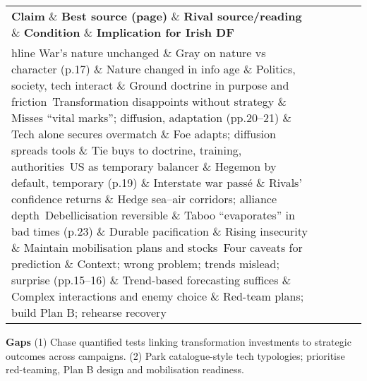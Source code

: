  
\begin{tabular}{p{3.2cm}p{4.2cm}p{3.6cm}p{3.2cm}p{4.2cm}}
	\textbf{Claim} \& \textbf{Best source (page)} \& \textbf{Rival source/reading} \& \textbf{Condition} \& \textbf{Implication for Irish DF}\\hline
	War’s nature unchanged \& Gray on nature vs character (p.17) \& Nature changed in info age \& Politics, society, tech interact \& Ground doctrine in purpose and friction\
	Transformation disappoints without strategy \& Misses “vital marks”; diffusion, adaptation (pp.20–21) \& Tech alone secures overmatch \& Foe adapts; diffusion spreads tools \& Tie buys to doctrine, training, authorities\
	US as temporary balancer \& Hegemon by default, temporary (p.19) \& Interstate war passé \& Rivals’ confidence returns \& Hedge sea–air corridors; alliance depth\
	Debellicisation reversible \& Taboo “evaporates” in bad times (p.23) \& Durable pacification \& Rising insecurity \& Maintain mobilisation plans and stocks\
	Four caveats for prediction \& Context; wrong problem; trends mislead; surprise (pp.15–16) \& Trend-based forecasting suffices \& Complex interactions and enemy choice \& Red-team plans; build Plan B; rehearse recovery\
\end{tabular}

\textbf{Gaps}
(1) Chase quantified tests linking transformation investments to strategic outcomes across campaigns.
(2) Park catalogue-style tech typologies; prioritise red-teaming, Plan B design and mobilisation readiness.

\parencite{KREPINEVICH_1996}

